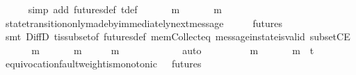 \begin{isabellebody}
\ \ \ \ \isamarkupfalse%
\ {\isacharparenleft}simp\ add{\isacharcolon}\ futures{\isacharunderscore}def\ {\isasymSigma}t{\isacharunderscore}def{\isacharparenright}\isanewline
\ \ \isamarkupfalse%
\ \isamarkupfalse%
\ {\isachardoublequoteopen}{\isasymexists}\ m\ {\isasymin}\ {\isasymsigma}{\isacharprime}\ {\isacharminus}\ {\isasymsigma}{\isachardot}\ {\isasymsigma}\ {\isasymunion}\ {\isacharbraceleft}m{\isacharbraceright}\ {\isasymin}\ {\isasymSigma}{\isachardoublequoteclose}\isanewline
\ \ \ \ \isamarkupfalse%
\ state{\isacharunderscore}transition{\isacharunderscore}only{\isacharunderscore}made{\isacharunderscore}by{\isacharunderscore}immediately{\isacharunderscore}next{\isacharunderscore}message\ {\isacartoucheopen}{\isasymsigma}\ {\isasymin}\ {\isasymSigma}{\isacartoucheclose}\ {\isacartoucheopen}{\isasymsigma}{\isacharprime}\ {\isasymin}\ futures\ {\isasymsigma}{\isacartoucheclose}\isanewline
\ \ \ \ \isamarkupfalse%
\ {\isacharparenleft}smt\ DiffD{}\ {\isasymSigma}t{\isacharunderscore}is{\isacharunderscore}subset{\isacharunderscore}of{\isacharunderscore}{\isasymSigma}\ futures{\isacharunderscore}def\ mem{\isacharunderscore}Collect{\isacharunderscore}eq\ message{\isacharunderscore}in{\isacharunderscore}state{\isacharunderscore}is{\isacharunderscore}valid\ subsetCE{\isacharparenright}\isanewline
\ \ \isamarkupfalse%
\ \isamarkupfalse%
\ {\isachardoublequoteopen}{\isasymexists}\ m\ {\isasymin}\ {\isasymsigma}{\isacharprime}\ {\isacharminus}\ {\isasymsigma}{\isachardot}\ {\isasymsigma}\ {\isasymunion}\ {\isacharbraceleft}m{\isacharbraceright}\ {\isasymin}\ {\isasymSigma}\ {\isasymand}\ {\isasymsigma}\ {\isasymunion}\ {\isacharbraceleft}m{\isacharbraceright}\ {\isasymsubseteq}\ {\isasymsigma}{\isacharprime}{\isachardoublequoteclose}\isanewline
\ \ \ \ \isamarkupfalse%
\ {\isacartoucheopen}{\isasymsigma}\ {\isasymsubset}\ {\isasymsigma}{\isacharprime}{\isacartoucheclose}\ \isamarkupfalse%
\ auto\ \ \ \ \isanewline
\ \ \isamarkupfalse%
\ \isamarkupfalse%
\ {\isachardoublequoteopen}{\isasymexists}m\ {\isasymin}\ {\isasymsigma}{\isacharprime}\ {\isacharminus}\ {\isasymsigma}{\isachardot}\ {\isasymsigma}\ {\isasymunion}\ {\isacharbraceleft}m{\isacharbraceright}\ {\isasymin}\ {\isasymSigma}t{\isachardoublequoteclose}\isanewline
\ \ \ \ \isamarkupfalse%
\ equivocation{\isacharunderscore}fault{\isacharunderscore}weight{\isacharunderscore}is{\isacharunderscore}monotonic\ {\isacartoucheopen}{\isasymsigma}{\isacharprime}\ {\isasymin}\ futures\ {\isasymsigma}{\isacartoucheclose}\ \ \ \ \isanewline

\end{isabellebody}
